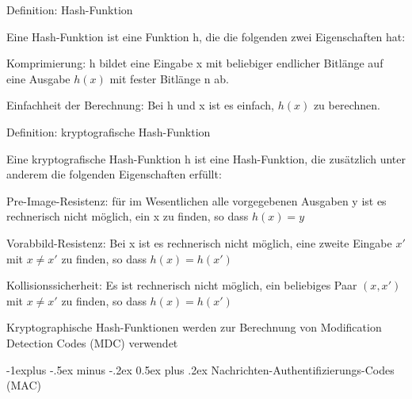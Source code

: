 \documentclass[a4paper]{article}
\makeatletter
\renewcommand{\subsection}{\@startsection{subsection}{2}{0mm}%
 {-1explus -.5ex minus -.2ex}%
 {0.5ex plus .2ex}%
 {\normalfont\normalsize\bfseries}}
\makeatother
\begin{document}
\begin{multicols}{3}
      \begin{itemize*}
            \item Definition: Hash-Funktion
            \begin{itemize*}
                  \item Eine Hash-Funktion ist eine Funktion h, die die folgenden zwei Eigenschaften hat:
                  \begin{itemize*} \item Komprimierung: h bildet eine Eingabe x mit beliebiger endlicher Bitlänge auf eine Ausgabe $h(x)$ mit fester Bitlänge n ab. \item Einfachheit der Berechnung: Bei h und x ist es einfach, $h(x)$ zu berechnen. \end{itemize*}
            \end{itemize*}
            \item Definition: kryptografische Hash-Funktion
            \begin{itemize*}
                  \item Eine kryptografische Hash-Funktion h ist eine Hash-Funktion, die zusätzlich unter anderem die folgenden Eigenschaften erfüllt:
                  \begin{itemize*} \item Pre-Image-Resistenz: für im Wesentlichen alle vorgegebenen Ausgaben y ist es rechnerisch nicht möglich, ein x zu finden, so dass $h(x)=y$ \item \begin{enumerate*} \def\labelenumi{\arabic{enumi}.} \setcounter{enumi}{1} \item Vorabbild-Resistenz: Bei x ist es rechnerisch nicht möglich, eine zweite Eingabe $x'$ mit $x\not= x'$ zu finden, so dass $h(x)=h(x')$ \end{enumerate*} \item Kollisionssicherheit: Es ist rechnerisch nicht möglich, ein beliebiges Paar $(x,x')$ mit $x\not= x'$ zu finden, so dass $h(x)=h(x')$ \end{itemize*}
                  \item Kryptographische Hash-Funktionen werden zur Berechnung von Modification Detection Codes (MDC) verwendet
            \end{itemize*}
      \end{itemize*}


      \subsection{Nachrichten-Authentifizierungs-Codes
            (MAC)}


\end{multicols}
\end{document}
